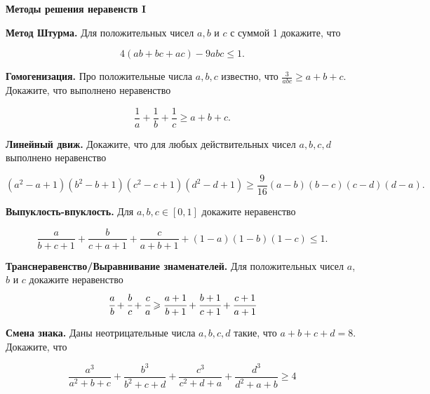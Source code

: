 \centerline{\bf \Huge Методы решения неравенств I}

\textbf{Метод Штурма.}
Для положительных чисел $a, b$ и $c$ с суммой 1 докажите, что

$$
4(a b+b c+a c)-9 a b c \leqslant 1 .
$$

\textbf{Гомогенизация.}
Про положительные числа $a, b, c$ известно, что $\frac{3}{a b c} \geqslant a+b+c$. Докажите, что выполнено неравенство

$$
\frac{1}{a}+\frac{1}{b}+\frac{1}{c} \geqslant a+b+c .
$$

\textbf{Линейный движ.}
Докажите, что для любых действительных чисел $a, b, c, d$ выполнено неравенство

$$
\left(a^2-a+1\right)\left(b^2-b+1\right)\left(c^2-c+1\right)\left(d^2-d+1\right) \geqslant \frac{9}{16}(a-b)(b-c)(c-d)(d-a) .
$$

\textbf{Выпуклость-впуклость.}
Для $a, b, c \in[0,1]$ докажите неравенство

$$
\frac{a}{b+c+1}+\frac{b}{c+a+1}+\frac{c}{a+b+1}+(1-a)(1-b)(1-c) \leqslant 1 .
$$

\textbf{Транснеравенство/Выравнивание знаменателей.}
Для положительных чисел $a$, $b$ и $c$ докажите неравенство
$$\cfrac a b+\cfrac b c+\cfrac c a\geqslant \cfrac{a+1}{b+1}+\cfrac{b+1}{c+1}+\cfrac{c+1}{a+1}$$

\textbf{Смена знака.}
Даны неотрицательные числа $a, b, c, d$ такие, что $a+b+c+d=8$. Докажите, что

$$
\frac{a^3}{a^2+b+c}+\frac{b^3}{b^2+c+d}+\frac{c^3}{c^2+d+a}+\frac{d^3}{d^2+a+b} \geqslant 4
$$  